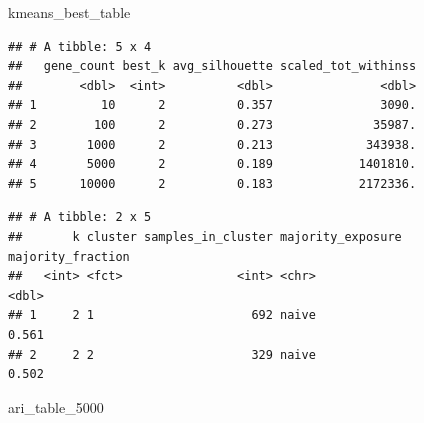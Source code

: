 \documentclass[
]{article}
\newenvironment{Shaded}{\begin{snugshade}}{\end{snugshade}}
\newcommand{\FunctionTok}[1]{\textcolor[rgb]{0.13,0.29,0.53}{\textbf{#1}}}
\newcommand{\NormalTok}[1]{#1}
\newcommand{\OtherTok}[1]{\textcolor[rgb]{0.56,0.35,0.01}{#1}}
\newcommand{\SpecialCharTok}[1]{\textcolor[rgb]{0.81,0.36,0.00}{\textbf{#1}}}
\newcommand{\StringTok}[1]{\textcolor[rgb]{0.31,0.60,0.02}{#1}}
\begin{document}
\begin{Shaded}
\begin{Highlighting}[]
\NormalTok{kmeans\_best\_table}
\end{Highlighting}
\end{Shaded}

\begin{verbatim}
## # A tibble: 5 x 4
##   gene_count best_k avg_silhouette scaled_tot_withinss
##        <dbl>  <int>          <dbl>               <dbl>
## 1         10      2          0.357               3090.
## 2        100      2          0.273              35987.
## 3       1000      2          0.213             343938.
## 4       5000      2          0.189            1401810.
## 5      10000      2          0.183            2172336.
\end{verbatim}

\begin{Shaded}
\end{Shaded}

\begin{verbatim}
## # A tibble: 2 x 5
##       k cluster samples_in_cluster majority_exposure majority_fraction
##   <int> <fct>                <int> <chr>                         <dbl>
## 1     2 1                      692 naive                         0.561
## 2     2 2                      329 naive                         0.502
\end{verbatim}

\begin{Shaded}
\begin{Highlighting}[]
\NormalTok{ari\_table\_5000}
\end{Highlighting}
\end{Shaded}
\end{document}
